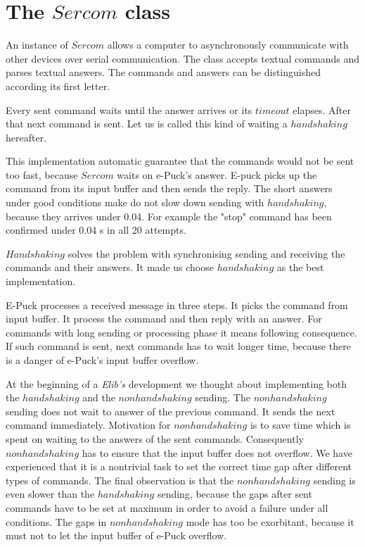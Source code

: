 \documentclass[12pt,notitlepage]{report}
\begin{document}
\section{The $Sercom$ class}\label{sec:sercom}
	An instance of $Sercom$ allows a computer to asynchronously communicate with other devices
	over serial communication. The class accepts textual commands and parses textual answers.
	The commands and answers can be distinguished according its first letter.
	
	Every sent command waits until the answer arrives or its $timeout$ elapses.
	After that next command is sent. Let us is called this kind of waiting a $handshaking$ hereafter.

	This implementation automatic guarantee that the commands would not be sent too fast,
	because $Sercom$ waits on e-Puck's answer. E-puck picks up the command from its input buffer and then sends the reply.
	The short answers under good conditions make do not slow down sending with $handshaking$, because
	they arrives under 0.04. For example the "stop" command has been confirmed under 0.04 s in all 20 attempts.

	$Handshaking$ solves the problem with synchronising sending and receiving the commands and their answers. 
	It made us choose $handshaking$ as the best implementation.

	E-Puck processes a received message in three steps. It picks the command from input buffer.
	It process the command and then reply with an answer.
	For commands with long sending or processing phase it means following consequence.
	If such command is sent, next commands has to wait longer time, because there is a
	danger of e-Puck's input buffer overflow.

	At the beginning of a {\it Elib's} development we thought about implementing both the $handshaking$
	and the $nonhandshaking$ sending.
	The $nonhandshaking$ sending does not wait to answer of the previous command. It sends the next command immediately. 
	Motivation for $nonhandshaking$ is to save time which is spent on waiting to the answers of the sent commands.
	Consequently $nonhandshaking$ has to ensure that the input buffer does not overflow.
	We have experienced that it is a nontrivial task to set the correct time gap after different types of commands. 
	The final observation is that the $nonhandshaking$ sending is even slower than the $handshaking$ sending, 
	because the gaps after sent commands have to be set at maximum in order to avoid a failure under all conditions. 
	The gaps in $nonhandshaking$ mode has too be exorbitant, %
	because it must not to let the input buffer of e-Puck overflow.
\end{document}
